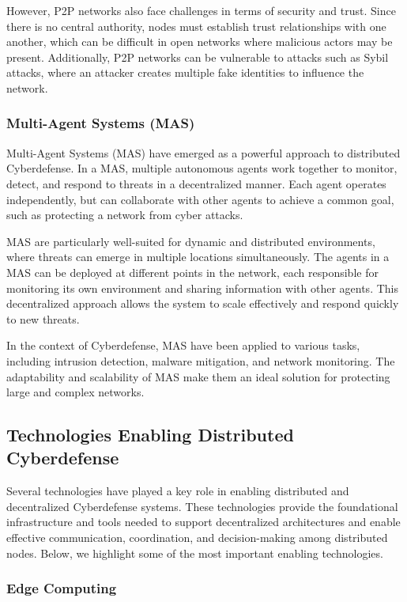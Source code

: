 However, P2P networks also face challenges in terms of security and trust. Since there is no central authority, nodes must establish trust relationships with one another, which can be difficult in open networks where malicious actors may be present. Additionally, P2P networks can be vulnerable to attacks such as Sybil attacks, where an attacker creates multiple fake identities to influence the network.

\subsubsection{Multi-Agent Systems (MAS)}

Multi-Agent Systems (MAS) have emerged as a powerful approach to distributed Cyberdefense. In a MAS, multiple autonomous agents work together to monitor, detect, and respond to threats in a decentralized manner. Each agent operates independently, but can collaborate with other agents to achieve a common goal, such as protecting a network from cyber attacks.

MAS are particularly well-suited for dynamic and distributed environments, where threats can emerge in multiple locations simultaneously. The agents in a MAS can be deployed at different points in the network, each responsible for monitoring its own environment and sharing information with other agents. This decentralized approach allows the system to scale effectively and respond quickly to new threats.

In the context of Cyberdefense, MAS have been applied to various tasks, including intrusion detection, malware mitigation, and network monitoring. The adaptability and scalability of MAS make them an ideal solution for protecting large and complex networks.

\subsection{Technologies Enabling Distributed Cyberdefense}

Several technologies have played a key role in enabling distributed and decentralized Cyberdefense systems. These technologies provide the foundational infrastructure and tools needed to support decentralized architectures and enable effective communication, coordination, and decision-making among distributed nodes. Below, we highlight some of the most important enabling technologies.

\subsubsection{Edge Computing}

